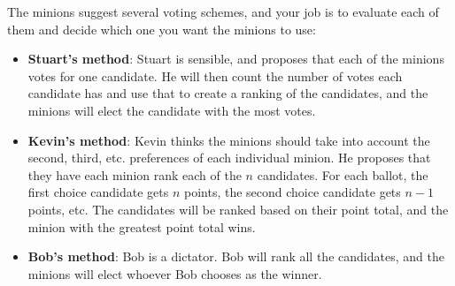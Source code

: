 \documentclass{article}
\begin{document}
The minions suggest several voting schemes, and your job is to evaluate each of them and decide which one you want the minions to use:
\begin{itemize}
	\item \textbf{Stuart’s method}: Stuart is sensible, and proposes that each of the minions votes for one candidate. He will then count the number of votes each candidate has and use that to create a ranking of the candidates, and the minions will elect the candidate with the most votes.
	\item \textbf{Kevin’s method}: Kevin thinks the minions should take into account the second, third, etc. preferences of each individual minion. He proposes that they have each minion rank each of the $n$ candidates. For each ballot, the first choice candidate gets $n$ points, the second choice candidate gets $n-1$ points, etc. The candidates will be ranked based on their point total, and the minion with the greatest point total wins.
	\item \textbf{Bob’s method}: Bob is a dictator. Bob will rank all the candidates, and the minions will elect whoever Bob chooses as the winner. 
\end{itemize}
\end{document}
